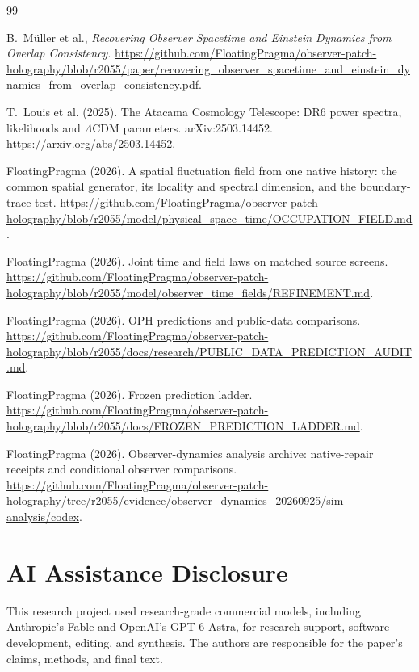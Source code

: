\documentclass[11pt]{article}
\begin{document}
\begin{thebibliography}{99}

B.~M\"uller et al., \emph{Recovering Observer Spacetime and Einstein
Dynamics from Overlap Consistency}.
\url{https://github.com/FloatingPragma/observer-patch-holography/blob/r2055/paper/recovering_observer_spacetime_and_einstein_dynamics_from_overlap_consistency.pdf}.

T.~Louis et al. (2025). The Atacama Cosmology Telescope: DR6 power spectra,
likelihoods and \(\Lambda\)CDM parameters. arXiv:2503.14452.
\url{https://arxiv.org/abs/2503.14452}.

FloatingPragma (2026). A spatial fluctuation field from one native history:
the common spatial generator, its locality and spectral dimension, and the
boundary-trace test.
\url{https://github.com/FloatingPragma/observer-patch-holography/blob/r2055/model/physical_space_time/OCCUPATION_FIELD.md}.

FloatingPragma (2026). Joint time and field laws on matched source screens.
\url{https://github.com/FloatingPragma/observer-patch-holography/blob/r2055/model/observer_time_fields/REFINEMENT.md}.

FloatingPragma (2026). OPH predictions and public-data comparisons.
\url{https://github.com/FloatingPragma/observer-patch-holography/blob/r2055/docs/research/PUBLIC_DATA_PREDICTION_AUDIT.md}.

FloatingPragma (2026). Frozen prediction ladder.
\url{https://github.com/FloatingPragma/observer-patch-holography/blob/r2055/docs/FROZEN_PREDICTION_LADDER.md}.

FloatingPragma (2026). Observer-dynamics analysis archive: native-repair
receipts and conditional observer comparisons.
\url{https://github.com/FloatingPragma/observer-patch-holography/tree/r2055/evidence/observer_dynamics_20260925/sim-analysis/codex}.

\end{thebibliography}

\section*{AI Assistance Disclosure}
This research project used research-grade commercial models, including
Anthropic's Fable and OpenAI's GPT-6 Astra, for research support, software
development, editing, and synthesis. The authors are responsible for the
paper's claims, methods, and final text.
\end{document}
